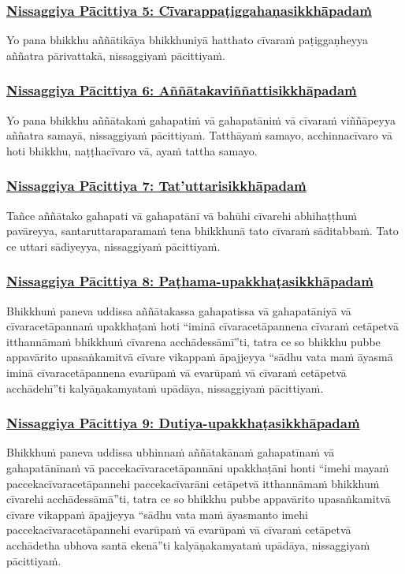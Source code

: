 \subsubsection*{\hyperref[forf-exp5]{Nissaggiya Pācittiya 5: Cīvarappaṭiggahaṇasikkhāpadaṁ}}
\label{np5}
Yo pana bhikkhu aññātikāya bhikkhuniyā hatthato cīvaraṁ paṭiggaṇheyya aññatra pārivattakā, nissaggiyaṁ pācittiyaṁ.

\subsubsection*{\hyperref[forf-exp6]{Nissaggiya Pācittiya 6: Aññātakaviññattisikkhāpadaṁ}}
\label{np6}
Yo pana bhikkhu aññātakaṁ gahapatiṁ vā gahapatāniṁ vā cīvaraṁ viññāpeyya aññatra samayā, nissaggiyaṁ pācittiyaṁ. Tatthāyaṁ samayo, acchinnacīvaro vā hoti bhikkhu, naṭṭhacīvaro vā, ayaṁ tattha samayo.

\subsubsection*{\hyperref[forf-exp7]{Nissaggiya Pācittiya 7: Tat'uttarisikkhāpadaṁ}}
\label{np7}
Tañce aññātako gahapati vā gahapatānī vā bahūhi cīvarehi abhihaṭṭhuṁ pavāreyya, santaruttaraparamaṁ tena bhikkhunā tato cīvaraṁ sāditabbaṁ. Tato ce uttari sādiyeyya, nissaggiyaṁ pācittiyaṁ.

\subsubsection*{\hyperref[forf-exp8]{Nissaggiya Pācittiya 8: Paṭhama-upakkhaṭasikkhāpadaṁ}}
\label{np8}
Bhikkhuṁ paneva uddissa aññātakassa gahapatissa vā gahapatāniyā vā cīvaracetāpannaṁ upakkhaṭaṁ hoti “iminā cīvaracetāpannena cīvaraṁ cetāpetvā itthannāmaṁ bhikkhuṁ cīvarena acchādessāmī”ti, tatra ce so bhikkhu pubbe appavārito upasaṅkamitvā cīvare vikappaṁ āpajjeyya “sādhu vata maṁ āyasmā iminā cīvaracetāpannena evarūpaṁ vā evarūpaṁ vā cīvaraṁ cetāpetvā acchādehī”ti kalyāṇakamyataṁ upādāya, nissaggiyaṁ pācittiyaṁ.

\subsubsection*{\hyperref[forf-exp9]{Nissaggiya Pācittiya 9: Dutiya-upakkhaṭasikkhāpadaṁ}}
\label{np9}
Bhikkhuṁ paneva uddissa ubhinnaṁ aññātakānaṁ gahapatīnaṁ vā gahapatānīnaṁ vā paccekacīvaracetāpannāni upakkhaṭāni honti “imehi mayaṁ paccekacīvaracetāpannehi paccekacīvarāni cetāpetvā itthannāmaṁ bhikkhuṁ cīvarehi acchādessāmā”ti, tatra ce so bhikkhu pubbe appavārito upasaṅkamitvā cīvare vikappaṁ āpajjeyya “sādhu vata maṁ āyasmanto imehi paccekacīvaracetāpannehi evarūpaṁ vā evarūpaṁ vā cīvaraṁ cetāpetvā acchādetha ubhova santā ekenā”ti kalyāṇakamyataṁ upādāya, nissaggiyaṁ pācittiyaṁ.

